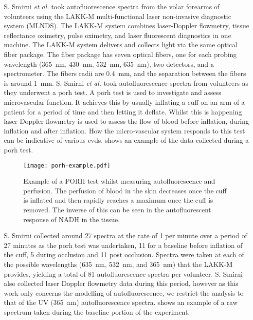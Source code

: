 S. Smirni \textit{et al.} took autofluorescence spectra from the volar forearms of volunteers using the LAKK-M multi-functional laser non-invasive diagnostic system (MLNDS)\@.
The LAKK-M system combines laser-Doppler flowmetry, tissue reflectance oximetry, pulse oximetry, and laser fluorescent diagnostics in one machine.
The LAKK-M system delivers and collects light via the same optical fiber package.
The fiber package has seven optical fibers, one for each probing wavelength (365~nm, 430~nm, 532~nm, 635~nm), two detectors, and a spectrometer.
The fibers radii are 0.4~mm, and the separation between the fibers is around 1~mm.
S. Smirni \textit{et al.} took autofluorescence spectra from volunteers as they underwent a \gls*{porh} test.
A \gls*{porh} test is used to investigate and assess microvascular function.
It achieves this by usually inflating a cuff on an arm of a patient for a period of time and then letting it deflate.
Whilst this is happening laser Doppler flowmetry is used to assess the flow of blood before inflation, during inflation and after inflation.
How the micro-vascular system responds to this test can be indicative of various \gls*{cvds}.
 shows an example of the data collected during a \gls*{porh} test.


\begin{figure}[!htpb]
  \centering
  \texttt{[image: porh-example.pdf]}
  \caption{Example of a PORH test whilst measuring autofluorescence and perfusion. The perfusion of blood in the skin decreases once the cuff is inflated and then rapidly reaches a maximum once the cuff is removed. The inverse of this can be seen in the autofluorescent response of NADH in the tissue.}
  \label{fig:porh}
\end{figure}

S. Smirni collected around 27 spectra at the rate of 1 per minute over a period of 27 minutes as the \gls*{porh} test was undertaken, 11 for a baseline before inflation of the cuff, 5 during occlusion and 11 post occlusion.
Spectra were taken at each of the possible wavelengths (635~nm, 532~nm, and 365~nm) that the LAKK-M provides, yielding a total of 81 autofluorescence spectra per volunteer.
S. Smirni also collected laser Doppler flowmetry data during this period, however as this work only concerns the modelling of autofluorescence, we restrict the analysis to that of the UV (365~nm) autofluorescence spectra.
 shows an example of a raw spectrum taken during the baseline portion of the experiment.


